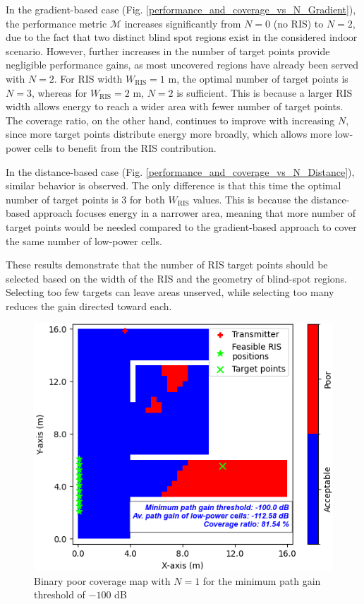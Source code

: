 \documentclass{IEEEoj}
\begin{document}
In the gradient-based case (Fig. \ref{performance_and_coverage_vs_N_Gradient}), the performance metric $\mathcal{M}$ increases significantly from $N = 0$ (no RIS) to $N = 2$, due to the fact that two distinct blind spot regions exist in the considered indoor scenario. However, further increases in the number of target points provide negligible performance gains, as most uncovered regions have already been served with $N = 2$. For RIS width $W_{\text{RIS}} = 1$ m, the optimal number of target points is $N = 3$, whereas for $W_{\text{RIS}} = 2$ m, $N = 2$ is sufficient. This is because a larger RIS width allows energy to reach a wider area with fewer number of target points. The coverage ratio, on the other hand, continues to improve with increasing $N$, since more target points distribute energy more broadly, which allows more low-power cells to benefit from the RIS contribution.

In the distance-based case (Fig. \ref{performance_and_coverage_vs_N_Distance}), similar behavior is observed. The only difference is that this time the optimal number of target points is $3$ for both $W_{\text{RIS}}$ values. This is because the distance-based approach focuses energy in a narrower area, meaning that more number of target points would be needed compared to the gradient-based approach to cover the same number of low-power cells.

These results demonstrate that the number of RIS target points should be selected based on the width of the RIS and the geometry of blind-spot regions. Selecting too few targets can leave areas unserved, while selecting too many reduces the gain directed toward each.

\begin{figure}
	\centering \includegraphics[width=\linewidth]{Sim_Results/Binary_Cov_Map_N_1_-100dB.png}
	\caption{Binary poor coverage map with $N = 1$ for the minimum path gain threshold of $-100$ dB}
	\label{binary_poor_cov_map_N_1}
\end{figure}
\end{document}
